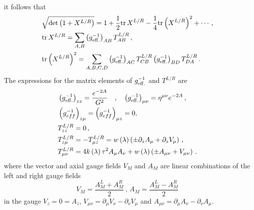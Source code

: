 \documentclass[a4paper,12pt]{article}
\begin{document}
it follows that
\begin{align}
&\sqrt{\text{det}  \left(1+X^{L/R}\right)} = 1 + \frac{1}{2} \text{tr} \, X^{L/R} - \frac{1}{4} \text{tr} \, {\left(X^{L/R}\right)}^2 + \cdots \, , \\
& \text{tr} \, X^{L/R} = \sum_{A,B}  \left( g^{-1}_{\rm{eff.}} \right)_{AB} T^{L/R}_{AB} \, , \\
& \text{tr} \, {\left(X^{L/R}\right)}^2 = \sum_{A,B,C,D}  \left( g^{-1}_{\rm{eff.}} \right)_{AC} T^{L/R}_{CB} \left( g^{-1}_{\rm{eff.}} \right)_{BD} T^{L/R}_{DA} \, .
\end{align}
The expressions for the matrix elements of  $g^{-1}_{\rm{eff.}}$ and $T^{L/R}$ are
\begin{align}
&\left(g^{-1}_{\rm{eff.}}\right)_{zz} = \frac{e^{-2A}}{G^2} \quad , \quad  \left(g^{-1}_{\rm{eff.}} \right)_{\mu \nu} = \eta^{\mu \nu} e^{-2A} \, , \\
&\left(g^{-1}_{eff}\right)_{z\mu} = \left(g^{-1}_{eff}\right)_{\mu z} = 0, \\
& T^{L/R}_{zz} = 0 \, , \\
& T^{L/R}_{z \mu} = - T^{L/R}_{\mu z} =  w\left(\lambda \right) \left(  \pm \partial_z A_\mu + \partial_z V_\mu \right) \, , \\
& T^{L/R}_{\mu \nu} = 4 k\left(\lambda\right) \tau^2 A_\mu A_\nu + w\left(\lambda \right) \left( \pm A_{\mu \nu} + V_{\mu \nu} \right) \, .
\end{align}
where the vector and axial gauge fields $V_M$ and $A_M$ are linear combinations of the left and right gauge fields
\begin{equation}
V_M = \frac{A^L_M + A^R_M}{2}\, , \, A_M = \frac{A^L_M - A^R_M}{2}
\end{equation}
in the gauge $V_z = 0 = A_z$, $V_{\mu \nu} = \partial_\mu V_\nu  - \partial_\nu V_\mu$ and $A_{\mu \nu} = \partial_\mu A_\nu  - \partial_\nu A_\mu$.
\end{document}
